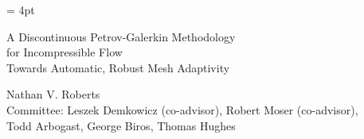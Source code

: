 \documentclass[12pt,c]{article}
\begin{document}
\baselineskip=16pt
\parskip= 4pt


%
%
%

\newpage


\begin{center}

{\huge
A Discontinuous Petrov-Galerkin Methodology\\ for Incompressible Flow\\[8pt]
}
{\LARGE
Towards Automatic, Robust Mesh Adaptivity
}
\vspace*{1cm}

\vspace*{.5cm}
{\large 

Nathan V. Roberts \\
Committee: Leszek Demkowicz (co-advisor), Robert Moser (co-advisor), \\
Todd Arbogast, George Biros, Thomas Hughes
}
\end{center}





%




\end{document}
